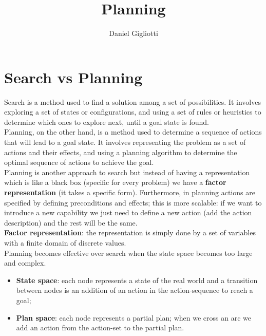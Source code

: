 \documentclass{article}
\title{Planning}
\author{Daniel Gigliotti}
\date{}
\begin{document}
\maketitle

\section{Search vs Planning}


Search is a method used to find a solution among a set of possibilities. It involves exploring a set of states or configurations, and using a set of rules or heuristics to determine which ones to explore next, until a goal state is found. \\

Planning, on the other hand, is a method used to determine a sequence of actions that will lead to a goal state. It involves representing the problem as a set of actions and their effects, and using a planning algorithm to determine the optimal sequence of actions to achieve the goal. \\

Planning is another approach to search but instead of having a representation which is like a black box (specific for every problem) we have a \textbf{factor representation} (it takes a specific form). Furthermore, in planning actions are specified by defining preconditions and effects; this is more scalable: if we want to introduce a new capability we just need to define a new action (add the action description) and the rest will be the same. \\

\textbf{Factor representation}: the representation is simply done by a set of variables with a finite domain of discrete values.\\ 

Planning becomes effective over search when the state space becomes too large and complex. 

\begin{itemize}
    \item \textbf{State space}: each node represents a state of the real world and a transition between nodes is an addition of an action in the action-sequence to reach a goal;
    \item \textbf{Plan space}: each node represents a partial plan; when we cross an arc we add an action from the action-set to the partial plan.
\end{itemize}
\end{document}
